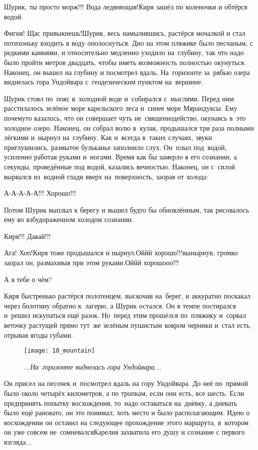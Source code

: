 \diagdash Шурик, ты просто морж!!! Вода ледянющая!\mdash Киря зашёл по коленочки и обтёрся водой.

\diagdash Фигня! Щас привыкнешь!\mdash Шурик, весь намылившись, растёрся мочалкой и стал потихоньку входить в воду ополоснуться. Дно на этом пляжике было песчаным, с редкими камнями, и относительно медленно уходило на~глубину, так что надо было пройти метров двадцать, чтобы иметь возможность полностью окунуться. Наконец, он вышел на глубину и посмотрел вдаль. На~горизонте за~рябью озера виднелась гора Ундойвара с~геодезическим пунктом на~вершине.  

Шурик стоял по~пояс в~холодной воде и~собирался с~мыслями. Перед ним расстилалось зелёное море карельского леса и~синее море Мярандуксы. Ему почему\sdash то казалось, что он совершает чуть не~священнодейство, окунаясь в~это холодное озеро. Наконец, он собрал волю в~кулак, продышался три раза полными лёгкими и~нырнул на~глубину. Как и~всегда в~таких случаях, звуки приглушились, размытое бульканье заполнило слух. Он~плыл под~водой, усиленно работая руками и~ногами. Время как бы замерло в его сознании, а секунды, проведённые под водой, казались вечностью. Наконец, он с~силой вырвался из~водной глади вверх на~поверхность, заорав от холода:

\diagdash А-А-А-А-А!!! Хорошо!!!
\nopagebreak

Потом Шурик выплыл к берегу и вышел будто бы обновлённым, так рисовалось ему во взбудораженном холодом сознании.

\diagdash Киря!!! Давай!!! 

\diagdash Ага! Хоп!\mdash Киря тоже продышался и нырнул.\mdash Ой\sdash й\sdash й хорошо!!!\mdash вынырнув, громко заорал он, размахивая при этом руками.\mdash Ой\sdash й\sdash й хорошо\sdash о\sdash о!!!

\diagdash А я тебе о чём?

Киря быстренько растёрся полотенцем, выскочив на~берег, и аккуратно поскакал через болотину обратно к~лагерю, а Шурик остался. Он в темпе постирался и~решил искупаться ещё разок. Но~перед этим прошёлся по~пляжику и~сорвал веточку растущей прямо тут~же зелёным пушистым ковром черники и~стал есть, отрывая ягоды губами. 

{
\setlength{\belowcaptionskip}{-5mm}
\begin{figure}[h]
\centering
\texttt{[image: 18\_mountain]}
\caption{\small\textit{...На~горизонте виднелась гора Ундойвара...}}
\end{figure}

Он присел на песочек и~посмотрел вдаль на гору Ундойвара. До неё по~прямой было около четырёх километров, а по тропкам, если они есть, все шесть. Если предпринять попытку восхождения, то~надо оставаться на~днёвку, а дневать было ещё рановато, он это понимал, хоть место и было располагающим. Идею о восхождении он оставил на следующее прохождение этого маршрута, в~котором он уже совсем не~сомневался\mdash Карелия захватила его душу и сознание с первого взгляда$\ldots$ 
}

